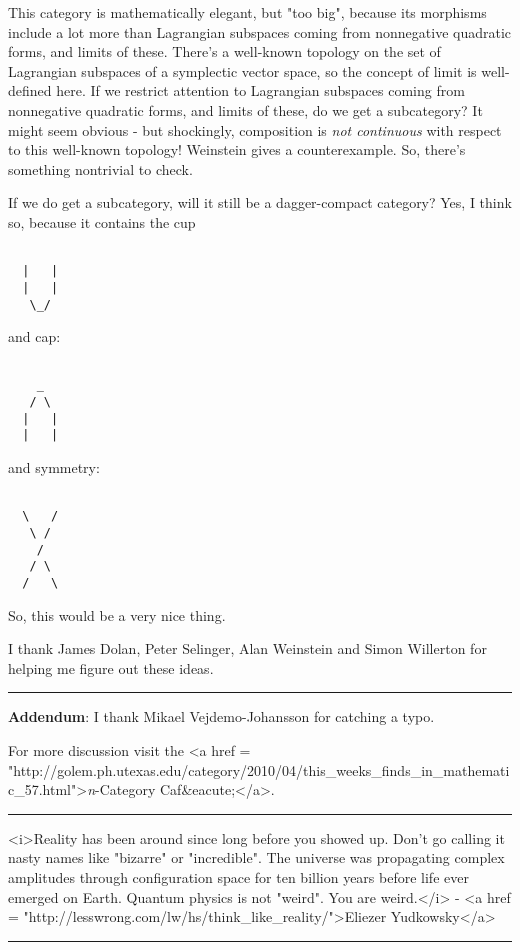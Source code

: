This category is mathematically elegant, but "too big",
because its morphisms include a lot more than Lagrangian subspaces
coming from nonnegative quadratic forms, and limits of these.  There's
a well-known topology on the set of Lagrangian subspaces of a
symplectic vector space, so the concept of limit is well-defined here.
If we restrict attention to Lagrangian subspaces coming from
nonnegative quadratic forms, and limits of these, do we get a
subcategory?  It might seem obvious - but shockingly, composition is
\emph{not continuous} with respect to this well-known topology!
Weinstein gives a counterexample.  So, there's something nontrivial to
check.

If we do get a subcategory, will it still be a dagger-compact category?
Yes, I think so, because it contains the cup


\begin{verbatim}

  |   |
  |   |
   \_/
\end{verbatim}
    
and cap:

\begin{verbatim}

    _
   / \
  |   |
  |   |
\end{verbatim}
    
and symmetry:


\begin{verbatim}

  \   /
   \ /
    /
   / \
  /   \
\end{verbatim}
    
So, this would be a very nice thing.

I thank James Dolan, Peter Selinger,
Alan Weinstein and Simon Willerton for 
helping me figure out these ideas.


\par\noindent\rule{\textwidth}{0.4pt}


\textbf{Addendum}: I thank Mikael Vejdemo-Johansson for catching a typo.

For more discussion visit the
<a href = "http://golem.ph.utexas.edu/category/2010/04/this_weeks_finds_in_mathematic_57.html">\emph{n}-Category Caf&eacute;</a>.

\par\noindent\rule{\textwidth}{0.4pt}


<i>Reality has been around since long before you showed up.  Don't go
calling it nasty names like "bizarre" or
"incredible".  The universe was propagating complex
amplitudes through configuration space for ten billion years before
life ever emerged on Earth.  Quantum physics is not "weird".
You are weird.</i> - <a href = "http://lesswrong.com/lw/hs/think_like_reality/">Eliezer Yudkowsky</a>

\par\noindent\rule{\textwidth}{0.4pt}

